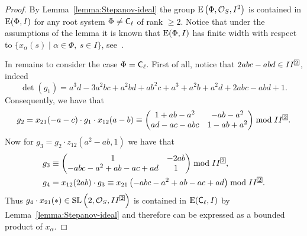 \begin{proof}
By Lemma~\ref{lemma:Stepanov-ideal} the group $\operatorname{E}\left(\Phi,\mathcal{O}_S,I^2\right)$ is contained in $\operatorname{E}(\Phi,I)$ for any root system $\Phi\neq\mathsf{C}_\ell$ of rank $\geqslant2$.
Notice that under the assumptions of the lemma it is known that $\operatorname{E}(\Phi,I)$ has finite width with respect to $\{x_\alpha(s)\mid\alpha\in\Phi,\ s\in I\}$, see~\cite[Theorem~3.3]{TavgenThesis}.

In remains to consider the case $\Phi=\mathsf{C}_\ell$. First of all, notice that $2abc-abd\in II^{\indexbox{2}}$, indeed
\[ \det(g_1)=a^3d-3a^2bc+a^2bd+ab^2c+a^3+a^2b+a^2d+2abc-abd+1. \]
Consequently, we have that
\[ g_2=x_{21}(-a-c)\cdot g_1\cdot x_{12}(a-b)\equiv
\begin{pmatrix}
1+ab-a^2 & -ab-a^2 \\ ad-ac-abc & 1-ab+a^2
\end{pmatrix}\bmod II^{\indexbox{2}}. \]
Now for $g_3=g_2\cdot z_{12}\left(a^2-ab,1\right)$ we have that
\begin{align*}
& g_3\equiv\begin{pmatrix} 1 & -2ab \\ -abc-a^2+ab-ac+ad & 1 \end{pmatrix}\bmod II^{\indexbox{2}},\\
& g_4=x_{12}(2ab)\cdot g_3\equiv x_{21}\left(-abc-a^2+ab-ac+ad\right)\bmod II^{\indexbox{2}}.
\end{align*}
Thus $g_4\cdot x_{21}(*)\in\SL\left(2,\mathcal{O}_S,II^{\indexbox{2}}\right)$ is contained in $\operatorname{E}(\mathsf{C}_\ell,I)$ by Lemma~\ref{lemma:Stepanov-ideal} and therefore can be expressed as a bounded product of $x_\alpha$.
\end{proof}